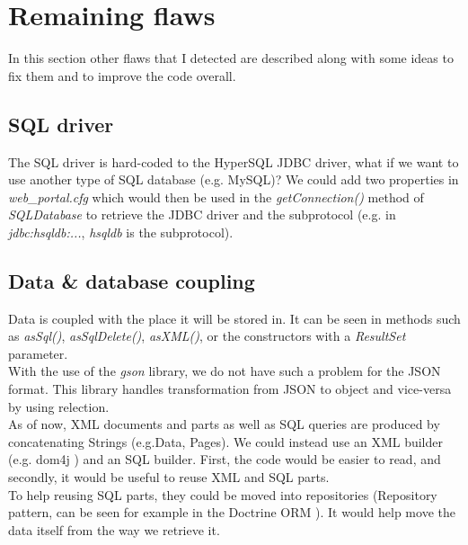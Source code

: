 \section{Remaining flaws}

In this section other flaws that I detected are described along with some ideas
to fix them and to improve the code overall.

\subsection*{SQL driver}
The SQL driver is hard-coded to the HyperSQL JDBC driver, what if we want to use
another type of SQL database (e.g. MySQL)? We could add two properties in
\emph{web\_portal.cfg} which would then be used in the \emph{getConnection()}
method of \emph{SQLDatabase} to retrieve the JDBC driver and the subprotocol
(e.g. in \emph{jdbc:hsqldb:...}, \emph{hsqldb} is the subprotocol).

\subsection*{Data \& database coupling}
Data is coupled with the place it will be stored in. It can be seen in methods
such as \emph{asSql()}, \emph{asSqlDelete()}, \emph{asXML()}, or the
constructors with a \emph{ResultSet} parameter.\\

With the use of the \emph{gson} library, we do not have such a problem for the
JSON format. This library handles transformation from JSON to object and
vice-versa by using relection.\\

As of now, XML documents and parts as well as SQL queries are produced by
concatenating Strings (e.g.Data, Pages). We could instead use an XML builder
(e.g. dom4j \cite{cite:dom4j}) and an SQL builder. First, the code would be
easier to read, and secondly, it would be useful to reuse XML and SQL parts.\\

To help reusing SQL parts, they could be moved into repositories (Repository
pattern, can be seen for example in the Doctrine ORM \cite{cite:doctrine}).
It would help move the data itself from the way we retrieve it.


\newpage
